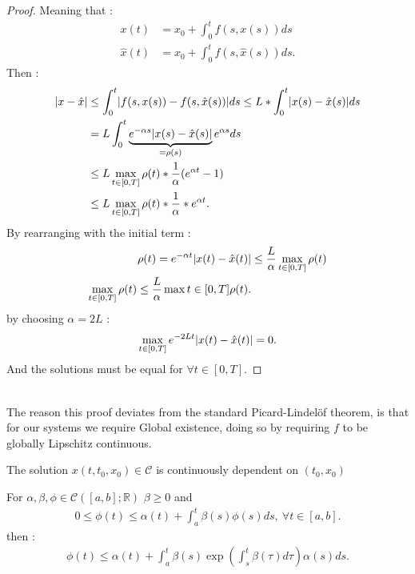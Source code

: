 \begin{proof}[Proof]
 Meaning that : 
 \begin{align*}
   x(t) &= x_0 + \int_0^{t} f(s,x(s)) ds \\
   \hat{x}(t) &= x_0 + \int_0^{t} f(s,\hat{x}(s) ) ds  
 .\end{align*}
 Then : 
 \begin{align*}
   \lvert x - \hat{x} \rvert &\le  \int_0^{t} \lvert f(s,x(s))-f(s,\hat{x}(s) )\rvert ds \le  L * \int_0^{t} \lvert x(s) - \hat{x}(s) \rvert ds  \\
                      &=  L \int_0^{t} \underbrace{e^{-\alpha s} \lvert x(s)-\hat{x}(s) \rvert}_{=\rho(s)} e^{\alpha s} ds \\
                      &\le  L \max_{t \in  [0,T]} \rho(t) * \frac{1}{\alpha } (e^{\alpha t} - 1) \\
                      &\le  L \max_{t \in  [0,T]} \rho(t) * \frac{1}{\alpha }* e^{\alpha t} 
 .\end{align*}
By rearranging with the initial term : 
\begin{align*}
  \rho(t) = e^{-\alpha t} \lvert x(t)-\hat{x}(t) \rvert &\le \frac{L}{\alpha } \max_{t \in [0,T]} \rho(t) \\
  \max_{t \in  [0,T]} \rho(t) \le  \frac{L}{\alpha } \max{t \in  [0,T]} \rho(t)
.\end{align*}
by choosing $\alpha = 2L$ : 
\begin{align*}
  \max_{t \in  [0,T]} e^{-2Lt} \lvert x(t)-\hat{x}(t) \rvert = 0 
.\end{align*}
And the solutions must be equal for $\forall  t \in  [0,T]$.
\end{proof}
\hspace{0mm}\\
The reason this proof deviates from the standard Picard-Lindelöf theorem, is that for our systems we require Global existence, doing so by requiring $f$ to be globally Lipschitz continuous.
\begin{theorem}
  The solution $x(t,t_0,x_0) \in  \mathcal{C}$ is continuously dependent on $(t_0,x_0)$
\end{theorem}
\begin{theorem}
  For $\alpha ,\beta ,\phi  \in  \mathcal{C}([a,b];\mathbb{R})$  $\beta \ge 0$ and 
  \begin{align*}
    0\le \phi(t) \le  \alpha(t) + \int_a^{t} \beta(s) \phi(s) ds , \ \forall t \in [a,b]
  .\end{align*}
  then : 
  \begin{align*}
    \phi(t) \le \alpha(t) + \int_{a}^{t} \beta(s) \exp\left(\int_s^{t} \beta(\tau ) d\tau   \right)  \alpha(s) ds
  .\end{align*}
\end{theorem}
